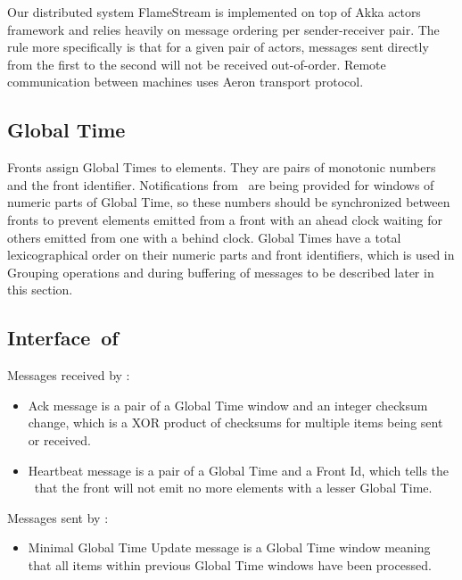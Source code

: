 \label {fs-acker-impl}


Our distributed system FlameStream is implemented on top of Akka actors framework and relies heavily on message ordering per sender-receiver pair. The rule more specifically is that for a given pair of actors, messages sent directly from the first to the second will not be received out-of-order. Remote communication between machines uses Aeron transport protocol.

\subsection{Global Time}

Fronts assign Global Times to elements. They are pairs of monotonic numbers and the front identifier. Notifications from \tracker\ are being provided for windows of numeric parts of Global Time, so these numbers should be synchronized between fronts to prevent elements emitted from a front with an ahead clock waiting for others emitted from one with a behind clock. Global Times have a total lexicographical order on their numeric parts and front identifiers, which is used in Grouping operations and during buffering of messages to be described later in this section.

\subsection{Interface\ of\ \tracker\ }

Messages received by \tracker:
\begin{itemize}
	\item Ack message is a pair of a Global Time window and an integer checksum change, which is a XOR product of checksums for multiple items being sent or received.
	\item Heartbeat message is a pair of a Global Time and a Front Id, which tells the \tracker\ that the front will not emit no more elements with a lesser Global Time.
\end{itemize}
Messages sent by \tracker:
\begin{itemize}
	\item Minimal Global Time Update message is a Global Time window meaning that all items within previous Global Time windows have been processed.
\end{itemize}


